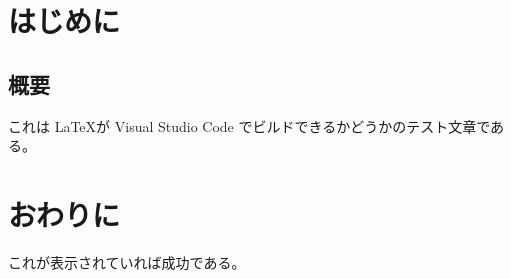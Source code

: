 \documentclass[xelatex,ja=standard]{bxjsreport}
\begin{document}
  \chapter{はじめに}
    \section{概要}
      これは \LaTeX が Visual Studio Code でビルドできるかどうかのテスト文章である。
  \chapter{おわりに}
    これが表示されていれば成功である。
\end{document}

